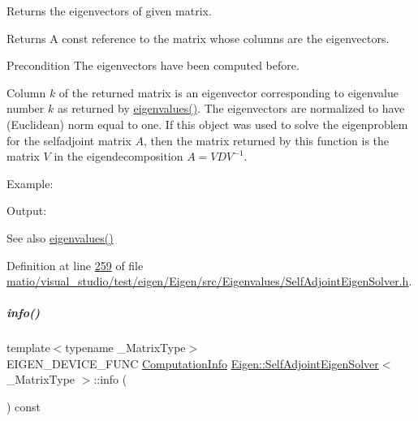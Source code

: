 Returns the eigenvectors of given matrix. 

\begin{DoxyReturn}{Returns}
A const reference to the matrix whose columns are the eigenvectors.
\end{DoxyReturn}
\begin{DoxyPrecond}{Precondition}
The eigenvectors have been computed before.
\end{DoxyPrecond}
Column $ k $ of the returned matrix is an eigenvector corresponding to eigenvalue number $ k $ as returned by \hyperlink{group___eigenvalues___module_a8efab27e82aa6aa0ae0c64739238c2e0}{eigenvalues()}. The eigenvectors are normalized to have (Euclidean) norm equal to one. If this object was used to solve the eigenproblem for the selfadjoint matrix $ A $, then the matrix returned by this function is the matrix $ V $ in the eigendecomposition $ A = V D V^{-1} $.

Example\+: 
\begin{DoxyCodeInclude}
\end{DoxyCodeInclude}
 Output\+: 
\begin{DoxyVerbInclude}
\end{DoxyVerbInclude}


\begin{DoxySeeAlso}{See also}
\hyperlink{group___eigenvalues___module_a8efab27e82aa6aa0ae0c64739238c2e0}{eigenvalues()} 
\end{DoxySeeAlso}


Definition at line \hyperlink{matio_2visual__studio_2test_2eigen_2_eigen_2src_2_eigenvalues_2_self_adjoint_eigen_solver_8h_source_l00259}{259} of file \hyperlink{matio_2visual__studio_2test_2eigen_2_eigen_2src_2_eigenvalues_2_self_adjoint_eigen_solver_8h_source}{matio/visual\+\_\+studio/test/eigen/\+Eigen/src/\+Eigenvalues/\+Self\+Adjoint\+Eigen\+Solver.\+h}.

\mbox{\label{group___eigenvalues___module_a56bd59b85a6f6f00ff7bff307ad0e015}} 
\subparagraph{\texorpdfstring{info()}{info()}\hspace{0.1cm}{\footnotesize\ttfamily [1/2]}}
{\footnotesize\ttfamily template$<$typename \+\_\+\+Matrix\+Type$>$ \\
E\+I\+G\+E\+N\+\_\+\+D\+E\+V\+I\+C\+E\+\_\+\+F\+U\+NC \hyperlink{group__enums_ga85fad7b87587764e5cf6b513a9e0ee5e}{Computation\+Info} \hyperlink{group___eigenvalues___module_class_eigen_1_1_self_adjoint_eigen_solver}{Eigen\+::\+Self\+Adjoint\+Eigen\+Solver}$<$ \+\_\+\+Matrix\+Type $>$\+::info (\begin{DoxyParamCaption}{ }\end{DoxyParamCaption}) const\hspace{0.3cm}{\ttfamily [inline]}}



